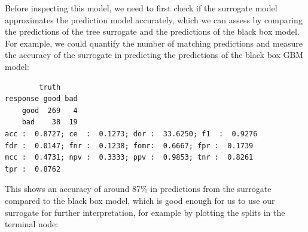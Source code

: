Before inspecting this model, we need to first check if the surrogate
model approximates the prediction model accurately, which we can assess
by comparing the predictions of the tree surrogate and the predictions
of the black box model. For example, we could quantify the number of
matching predictions and measure the accuracy of the surrogate in
predicting the predictions of the black box GBM model:

\begin{Shaded}
\begin{Highlighting}[]
\OtherTok{=}\SpecialCharTok{$} \NormalTok{)}\SpecialCharTok{$}
\OtherTok{=}  \NormalTok{(}\NormalTok{, }\NormalTok{))}
\OtherTok{=}\SpecialCharTok{$}\SpecialCharTok{$}
\OtherTok{=}\SpecialCharTok{::}
   \NormalTok{)}
\end{Highlighting}
\end{Shaded}

\begin{verbatim}
        truth
response good bad
    good  269   4
    bad    38  19
acc :  0.8727; ce  :  0.1273; dor :  33.6250; f1  :  0.9276 
fdr :  0.0147; fnr :  0.1238; fomr:  0.6667; fpr :  0.1739 
mcc :  0.4731; npv :  0.3333; ppv :  0.9853; tnr :  0.8261 
tpr :  0.8762 
\end{verbatim}

This shows an accuracy of around 87\% in predictions from the surrogate
compared to the black box model, which is good enough for us to use our
surrogate for further interpretation, for example by plotting the splits
in the terminal node:

\begin{Shaded}
\begin{Highlighting}[]
\SpecialCharTok{$}\NormalTok{()}
\end{Highlighting}
\end{Shaded}

